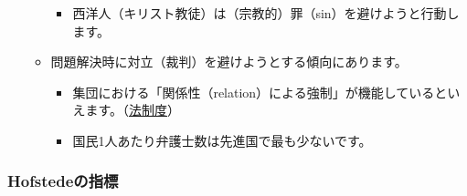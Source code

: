 \documentclass[
]{book}
\providecommand{\tightlist}{%
  \setlength{\itemsep}{0pt}\setlength{\parskip}{0pt}}
\begin{document}
\begin{itemize}
\begin{itemize}
    \begin{itemize}
    \tightlist
    \item
      西洋人（キリスト教徒）は（宗教的）罪（sin）を避けようと行動します。
    \end{itemize}
  \item
    問題解決時に対立（裁判）を避けようとする傾向にあります。

    \begin{itemize}
    \item
      集団における「関係性（relation）による強制」が機能しているといえます。（\protect\hyperlink{law}{法制度}）
    \item
      国民1人あたり弁護士数は先進国で最も少ないです。
    \end{itemize}
  \end{itemize}
\end{itemize}

\hypertarget{hofstedeux306eux6307ux6a19-1}{%
\subsubsection{Hofstedeの指標}\label{hofstedeux306eux6307ux6a19-1}}
\end{document}
